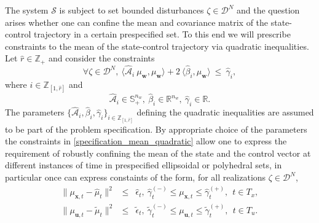\documentclass[letterpaper,11pt]{article}
\begin{document}
The system $\mathcal{S}$ is subject to set bounded disturbances $ \zeta \in \mathscr{D}^N$ and the question arises whether one can confine the  mean and covariance 
matrix of the state-control trajectory in a certain prespecified set. 
To this end 
we will prescribe constraints to the mean of the state-control trajectory via quadratic inequalities. Let $ \hat{r} \in \mathbb{Z}_+$ and consider the constraints 
\begin{equation}
\label{specification_mean_quadratic}
\forall   \zeta \in \mathscr{D}^N, ~ \langle \hat{\mathcal{A}}_i ~  \mu_\mathbf{w},   \mu_\mathbf{w} \rangle + 2 ~ \langle \hat{\beta}_i ,  \mu_\mathbf{w} \rangle  ~ \leq~ \hat{\gamma}_i, 
\end{equation}
where $ i \in \mathbb{Z}_{[1,\hat{r}]}$ and
\begin{equation}
\label{parameters_mean_quadratic}
\hat{\mathcal{A}}_i \in \mathbb{S}_+^{n_w},~ \hat{\beta}_i \in \mathbb{R}^{n_w }, ~\hat{\gamma}_i \in \mathbb{R}.
\end{equation}
The parameters $ \{ \hat{\mathcal{A}}_i,  \hat{\beta}_i, \hat{\gamma}_i \}_{i \in \mathbb{Z}_{[1,\hat{r}]}}$ defining the quadratic inequalities are assumed to be part of the problem specification.
By appropriate choice of the parameters the constraints in \eqref{specification_mean_quadratic} allow 
one to express the requirement 
of robustly confining the mean of the state and the control vector
at different instances of time in prespecified ellipsoidal or polyhedral sets, in particular once can express constaints of the form, for all realizations $ \zeta \in \mathscr{D}^N$,
\begin{eqnarray*}
	\| \mu_{\mathbf{x},t} - \hat{\mu}_t \|^2  & \leq &  \hat{\epsilon}_t, ~
	\hat{\gamma}_t^{(-)} \leq \mu_{\mathbf{x},t}  \leq  \hat{\gamma}_t^{(+)},  ~~ t \in T_x, \\
	\| \mu_{\mathbf{u},t} - \tilde{\mu}_t \|^2 & \leq &   \tilde{\epsilon}_t, ~
	\tilde{\gamma}_t^{(-)} \leq \mu_{\mathbf{u},t}  \leq  \tilde{\gamma}_t^{(+)},  ~~t \in T_u. 
\end{eqnarray*}
\end{document}

